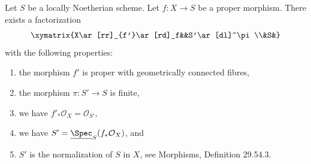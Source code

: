 \begin{theorem}
Let $S$ be a locally Noetherian scheme. Let $f:X\to S$ be a proper morphism. There exists a factorization
\[\xymatrix{X\ar[rr]_{f'}\ar[rd]_f&&S'\ar[dl]^\pi\\&S&}\]
with the following properties:
\begin{enumerate}
\item the morphism $f'$ is proper with geometrically connected fibres,
\item the morphism $\pi:S'\to S$ is finite,
\item we have $f'_*\mathcal O_X=\mathcal O_{S'}$,
\item we have $S'=\underline{\Spec}_S(f_*\mathcal O_X)$, and
\item $S'$ is the normalization of $S$ in $X$, see Morphisms, Definition 29.54.3.
\end{enumerate}
\end{theorem}
